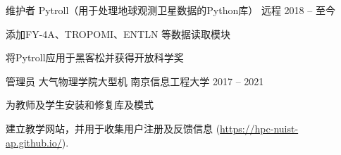 

\begin{cventries}

  \cventry
    {维护者} %
    {Pytroll（用于处理地球观测卫星数据的Python库）} %
    {远程} %
    {2018 -- 至今} %
    {
      \begin{cvitems} %
        \item {添加FY-4A、TROPOMI、ENTLN 等数据读取模块}
        \item {将Pytroll应用于黑客松并获得开放科学奖}
      \end{cvitems}
    }

  \cventry
    {管理员} %
    {大气物理学院大型机} %
    {南京信息工程大学} %
    {2017 -- 2021} %
    {
      \begin{cvitems} %
        \item {为教师及学生安装和修复库及模式}
        \item {建立教学网站，并用于收集用户注册及反馈信息 (\url{https://hpc-nuist-ap.github.io/}).}
      \end{cvitems}
    }

\end{cventries}
